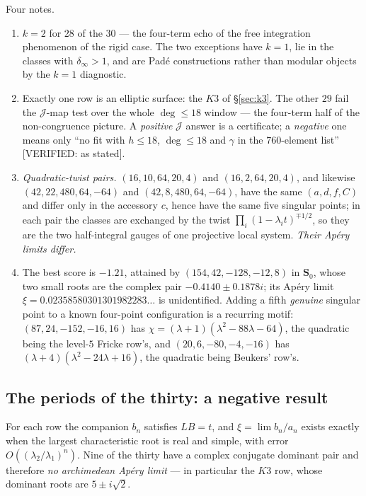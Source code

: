 \documentclass[11pt,reqno]{amsart}
\theoremstyle{plain}
\theoremstyle{definition}
\theoremstyle{remark}
\theoremstyle{plain}
\newcommand{\Jm}{\mathcal J}
\newcommand{\Verified}[1]{\textup{\textsf{[VERIFIED: #1]}}}
\begin{document}
Four notes.

\begin{enumerate}[label=\textup{\arabic*.},leftmargin=2.1em]
\item $k=2$ for $28$ of the $30$ --- the four-term echo of the free integration
phenomenon of the rigid case. The two exceptions have $k=1$, lie in the classes
with $\delta_\infty>1$, and are Pad\'e constructions rather than modular objects
by the $k=1$ diagnostic.
\item Exactly one row is an elliptic surface: the $K3$ of \S\ref{sec:k3}. The
other $29$ fail the $\Jm$-map test over the whole $\deg\le18$ window --- the
four-term half of the non-congruence picture. A \emph{positive} $\Jm$ answer is a
certificate; a \emph{negative} one means only ``no fit with $h\le18$, $\deg\le18$
and $\gamma$ in the $760$-element list'' \Verified{as stated}.
\item \emph{Quadratic-twist pairs.} $(16,10,64,20,4)$ and $(16,2,64,20,4)$, and
likewise $(42,22,480,64,-64)$ and $(42,8,480,64,-64)$, have the same $(a,d,f,C)$
and differ only in the accessory $c$, hence have the same five singular points;
in each pair the classes are exchanged by the twist
$\prod_i(1-\lambda_it)^{\mp1/2}$, so they are the two half-integral gauges of one
projective local system. \emph{Their Ap\'ery limits differ.}
\item The best score is $-1.21$, attained by $(154,42,-128,-12,8)$ in
$\mathbf S_0$, whose two small roots are the complex pair $-0.4140\pm0.1878i$;
its Ap\'ery limit $\xi=0.02358580301301982283\dots$ is unidentified. Adding a
fifth \emph{genuine} singular point to a known four-point configuration is a
recurring motif: $(87,24,-152,-16,16)$ has
$\chi=(\lambda+1)(\lambda^2-88\lambda-64)$, the quadratic being the level-$5$
Fricke row's, and $(20,6,-80,-4,-16)$ has $(\lambda+4)(\lambda^2-24\lambda+16)$,
the quadratic being Beukers' row's.
\end{enumerate}

\subsection{The periods of the thirty: a negative result}\label{sec:negper}
For each row the companion $b_n$ satisfies $LB=t$, and $\xi=\lim b_n/a_n$ exists
exactly when the largest characteristic root is real and simple, with error
$O((\lambda_2/\lambda_1)^n)$. Nine of the thirty have a complex conjugate
dominant pair and therefore \emph{no archimedean Ap\'ery limit} --- in
particular the $K3$ row, whose dominant roots are $5\pm i\sqrt2$.
\end{document}
